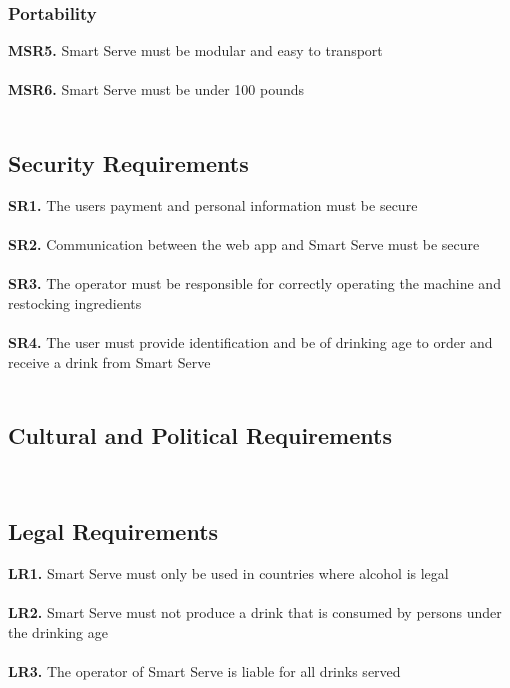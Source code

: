 \documentclass{article}
\begin{document}
    \subsubsection{Portability}
        \noindent\textbf{MSR5.} Smart Serve must be modular and easy to transport \\\\
        \textbf{MSR6.} Smart Serve must be under 100 pounds \\\\

\subsection{Security Requirements}
    \noindent\textbf{SR1.} The users payment and personal information must be secure \\\\
    \textbf{SR2.} Communication between the web app and Smart Serve must be secure \\\\
    \textbf{SR3.} The operator must be responsible for correctly operating the machine and restocking ingredients \\\\
    \textbf{SR4.} The user must provide identification and be of drinking age to order and receive a drink from Smart Serve \\\\

\subsection{Cultural and Political Requirements}
     \\
\subsection{Legal Requirements}
    \noindent\textbf{LR1.} Smart Serve must only be used in countries where alcohol is legal \\\\
    \textbf{LR2.} Smart Serve must not produce a drink that is consumed by persons under the drinking age \\\\
    \textbf{LR3.} The operator of Smart Serve is liable for all drinks served \\\\
\end{document}
